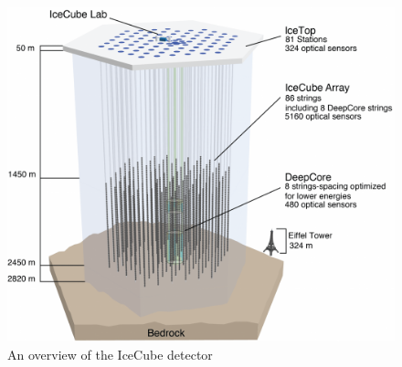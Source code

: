 \begin{figure}
	\centering \includegraphics{figures/icecube/IceCubeArray_slim.png}
	\caption{An overview of the IceCube detector}
	\label{fig:ic_detector}
\end{figure}

